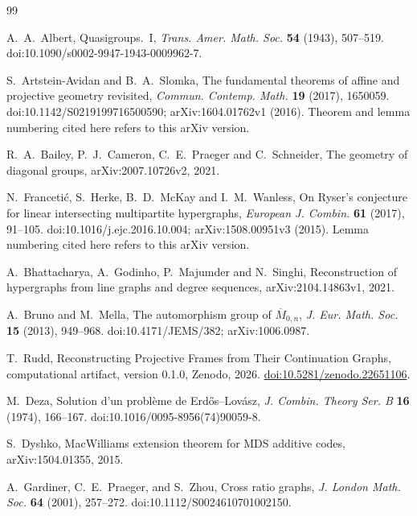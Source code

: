 \documentclass[11pt]{article}
\theoremstyle{definition}
\theoremstyle{remark}
\begin{document}
\begin{thebibliography}{99}
\small

A.~A.~Albert,
\newblock Quasigroups.~I,
\newblock \emph{Trans. Amer. Math. Soc.} \textbf{54} (1943), 507--519.
\newblock doi:10.1090/s0002-9947-1943-0009962-7.

S.~Artstein-Avidan and B.~A.~Slomka,
\newblock The fundamental theorems of affine and projective geometry revisited,
\newblock \emph{Commun. Contemp. Math.} \textbf{19} (2017), 1650059.
\newblock doi:10.1142/S0219199716500590; arXiv:1604.01762v1 (2016).
Theorem and lemma numbering cited here refers to this arXiv version.

R.~A.~Bailey, P.~J.~Cameron, C.~E.~Praeger and C.~Schneider,
\newblock The geometry of diagonal groups,
\newblock arXiv:2007.10726v2, 2021.

N.~Franceti\'c, S.~Herke, B.~D.~McKay and I.~M.~Wanless,
\newblock On Ryser's conjecture for linear intersecting multipartite hypergraphs,
\newblock \emph{European J. Combin.} \textbf{61} (2017), 91--105.
\newblock doi:10.1016/j.ejc.2016.10.004; arXiv:1508.00951v3 (2015).
Lemma numbering cited here refers to this arXiv version.

A.~Bhattacharya, A.~Godinho, P.~Majumder and N.~Singhi,
\newblock Reconstruction of hypergraphs from line graphs and degree sequences,
\newblock arXiv:2104.14863v1, 2021.

A.~Bruno and M.~Mella,
\newblock The automorphism group of $\overline{M}_{0,n}$,
\newblock \emph{J. Eur. Math. Soc.} \textbf{15} (2013), 949--968.
\newblock doi:10.4171/JEMS/382; arXiv:1006.0987.

T.~Rudd,
\newblock Reconstructing Projective Frames from Their Continuation Graphs,
\newblock computational artifact, version 0.1.0, Zenodo, 2026.
\newblock \href{https://doi.org/10.5281/zenodo.22651106}{doi:10.5281/zenodo.22651106}.

M.~Deza,
\newblock Solution d'un probl\`eme de Erd\H{o}s--Lov\'asz,
\newblock \emph{J. Combin. Theory Ser. B} \textbf{16} (1974), 166--167.
\newblock doi:10.1016/0095-8956(74)90059-8.

S.~Dyshko,
\newblock MacWilliams extension theorem for MDS additive codes,
\newblock arXiv:1504.01355, 2015.

A.~Gardiner, C.~E.~Praeger, and S.~Zhou,
\newblock Cross ratio graphs,
\newblock \emph{J. London Math. Soc.} \textbf{64} (2001), 257--272.
\newblock doi:10.1112/S0024610701002150.


\end{thebibliography}
\end{document}
